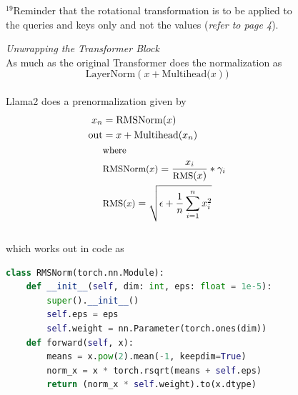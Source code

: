 \documentclass[12pt]{article}
\newcommand{\customtext}[3]{%
    \vspace{#2} %
    \fontsize{13}{8}\textcolor{#1}{\textit{#3}}%
}
\begin{document}
\begin{figure}[!htb]
\begin{minipage}[t]{0.65\textwidth}
\end{minipage}%
\hspace{25pt}
\begin{minipage}[t]{.4\textwidth}
  \raggedright
  \scriptsize 
  $^{19}$Reminder that the rotational transformation is to be applied to the queries and keys only and not the values
  ({\it refer to page 4}).
\end{minipage}
\end{figure}
\pagebreak
\begin{figure}[!htb]
    \begin{minipage}[t]{0.65\textwidth}
    \raggedright
{}
\customtext{xtitle}{0em}{Unwrapping the Transformer Block}\\
As much as the original Transformer does the normalization as
\vspace{-1em}
$$\text{LayerNorm}(x  + \text{Multihead(}x))$$
\vspace{-2.7em}\\
Llama2 does a prenormalization given by
\vspace{-1em}
\begin{align*}
    x_n & = \text{RMSNorm}(x)\\
    \text{out} & = x  + \text{Multihead(}x_n)\\
    & \text{\small where}\\
    & \text{\small RMSNorm($x$)}=\frac{x_i}{\text{\small RMS}(x)}*\gamma_i\\
    & \text{\small RMS($x$)} = \sqrt{\epsilon+\frac{1}{n}\sum_{i=1}^nx_i^2}
\end{align*}
\vspace{-1.5em}\\
which works out in code as 
\begin{lstlisting}[language=python,style=python,basicstyle=\ttfamily\footnotesize]
class RMSNorm(torch.nn.Module):
    def __init__(self, dim: int, eps: float = 1e-5):
        super().__init__()
        self.eps = eps
        self.weight = nn.Parameter(torch.ones(dim))
    def forward(self, x):
        means = x.pow(2).mean(-1, keepdim=True)
        norm_x = x * torch.rsqrt(means + self.eps)
        return (norm_x * self.weight).to(x.dtype)


\end{lstlisting}
\end{minipage}
\end{figure}
\end{document}
